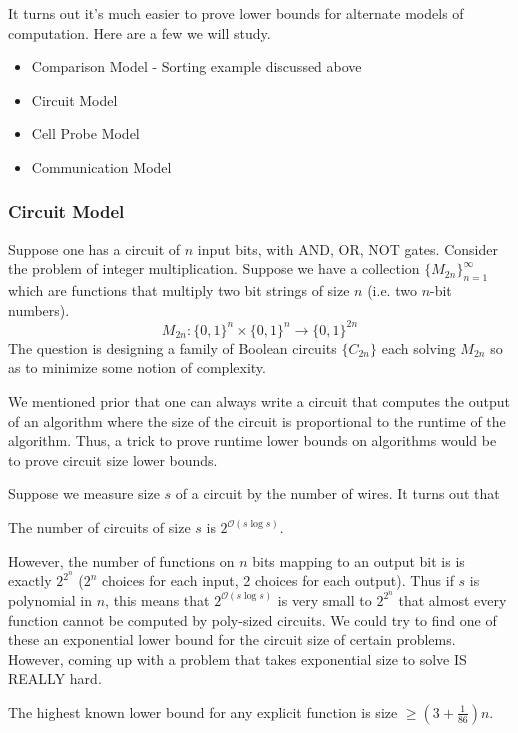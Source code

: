 It turns out it's much easier to prove lower bounds for alternate models of computation. Here are a few we will study.

\begin{itemize}
    \item Comparison Model - Sorting example discussed above
    \item Circuit Model
    \item Cell Probe Model
    \item Communication Model
\end{itemize}

\subsubsection{Circuit Model}
Suppose one has a circuit of $n$ input bits, with AND, OR, NOT gates. Consider the problem of integer multiplication. Suppose we have a collection $\{M_{2n}\}_{n = 1}^{\infty}$
which are functions that multiply two bit strings of size $n$ (i.e. two $n$-bit numbers).
\[ M_{2n} : \{0, 1\}^n \times \{0, 1\}^n \to \{0, 1\}^{2n} \]
The question is designing a family of Boolean circuits $\{C_{2n}\}$ each solving $M_{2n}$ so as to minimize some notion of complexity.

We mentioned prior that one can always write a circuit that computes the output of an algorithm where the size of the circuit is proportional to the runtime of the algorithm.
Thus, a trick to prove runtime lower bounds on algorithms would be to prove circuit size lower bounds.

Suppose we measure size $s$ of a circuit by the number of wires. It turns out that
\begin{theorem}
    The number of circuits of size $s$ is $2^{\mathcal{O}(s \log s)}$.
\end{theorem}

However, the number of functions on $n$ bits mapping to an output bit is is exactly $2^{2^n}$ ($2^n$ choices for each input, 2 choices for each output).
Thus if $s$ is polynomial in $n$, this means that $2^{\mathcal{O}(s \log s)}$ is very small to $2^{2^n}$ that almost every function cannot be computed by poly-sized circuits.
We could try to find one of these an exponential lower bound for the circuit size of certain problems.
However, coming up with a problem that takes exponential size to solve IS REALLY hard.

\begin{note}
    The highest known lower bound for any explicit function is size $\geq (3 + \frac{1}{86}) n$.
\end{note}

